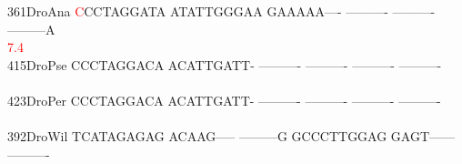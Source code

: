 \documentclass[11pt,twoside,reqno,a4paper]{article}
\begin{document}
{361\hspace*{1\charwidth}DroAna	\textcolor{Red}{C}CCTAGGATA	ATATTGGGAA	GAAAAA----	----------	----------	---------A	\\
\hspace*{4\charwidth}\hspace*{7\charwidth}\hspace*{0\charwidth}\textcolor{Red}{7.4}\hspace*{1\charwidth}\hspace*{1\charwidth}\hspace*{1\charwidth}\hspace*{1\charwidth}\hspace*{1\charwidth}\hspace*{1\charwidth}\\
415\hspace*{1\charwidth}DroPse	CCCTAGGACA	ACATTGATT-	----------	----------	----------	----------	\\
\hspace*{4\charwidth}\hspace*{7\charwidth}\hspace*{1\charwidth}\hspace*{1\charwidth}\hspace*{1\charwidth}\hspace*{1\charwidth}\hspace*{1\charwidth}\hspace*{1\charwidth}\\
423\hspace*{1\charwidth}DroPer	CCCTAGGACA	ACATTGATT-	----------	----------	----------	----------	\\
\hspace*{4\charwidth}\hspace*{7\charwidth}\hspace*{1\charwidth}\hspace*{1\charwidth}\hspace*{1\charwidth}\hspace*{1\charwidth}\hspace*{1\charwidth}\hspace*{1\charwidth}\\
392\hspace*{1\charwidth}DroWil	TCATAGAGAG	ACAAG-----	---------G	GCCCTTGGAG	GAGT------	----------	\\
\hspace*{4\charwidth}\hspace*{7\charwidth}\hspace*{1\charwidth}\hspace*{1\charwidth}\hspace*{1\charwidth}\hspace*{1\charwidth}\hspace*{1\charwidth}\hspace*{1\charwidth}\\
}
\end{document}
